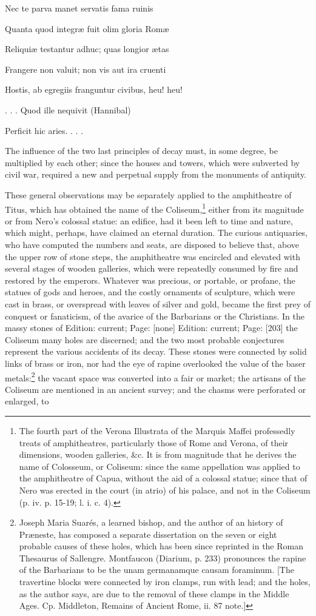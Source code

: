 {{}Nec te parva manet servatis fama ruinis

Quanta quod integræ fuit olim gloria Romæ

Reliquiæ testantur adhuc; quas longior ætas

Frangere non valuit; non vis aut ira cruenti

Hostis, ab egregiis franguntur civibus, heu! heu!

. . . Quod ille nequivit (Hannibal)

Perficit hic aries. . . .} The influence of the two last principles of decay must, in some degree, be multiplied by each other; since the houses and towers, which were subverted by civil war, required a new and perpetual supply from the monuments of antiquity.

These general observations may be separately applied to the amphitheatre of Titus, which has obtained the name of the Coliseum,\footnote{The fourth part of the Verona Illustrata of the Marquis Maffei professedly treats of amphitheatres, particularly those of Rome and Verona, of their dimensions, wooden galleries, \&c. It is from magnitude that he derives the name of Colosseum, or Coliseum: since the same appellation was applied to the amphitheatre of Capua, without the aid of a colossal statue; since that of Nero was erected in the court (in atrio) of his palace, and not in the Coliseum (p. iv. p. 15-19; l. i. c. 4).} either from its magnitude or from Nero\texthebrew{}’s colossal statue: an edifice, had it been left to time and nature, which might, perhaps, have claimed an eternal duration. The curious antiquaries, who have computed the numbers and seats, are disposed to believe that, above the upper row of stone steps, the amphitheatre was encircled and elevated with several stages of wooden galleries, which were repeatedly consumed by fire and restored by the emperors. Whatever was precious, or portable, or profane, the statues of gods and heroes, and the costly ornaments of sculpture, which were cast in brass, or overspread with leaves of silver and gold, became the first prey of conquest or fanaticism, of the avarice of the Barbarians or the Christians. In the massy stones of Edition: current; Page: [none] Edition: current; Page: [203] the Coliseum many holes are discerned; and the two most probable conjectures represent the various accidents of its decay. These stones were connected by solid links of brass or iron, nor had the eye of rapine overlooked the value of the baser metals:\footnote{Joseph Maria Suarés, a learned bishop, and the author of an history of Præneste, has composed a separate dissertation on the seven or eight probable causes of these holes, which has been since reprinted in the Roman Thesaurus of Sallengre. Montfaucon (Diarium, p. 233) pronounces the rapine of the Barbarians to be the unam germanamque causam foraminum. [The travertine blocks were connected by iron clamps, run with lead; and the holes, as the author says, are due to the removal of these clamps in the Middle Ages. Cp. Middleton, Remains of Ancient Rome, ii. 87 note.]} the vacant space was converted into a fair or market; the artisans of the Coliseum are mentioned in an ancient survey; and the chasms were perforated or enlarged, to 